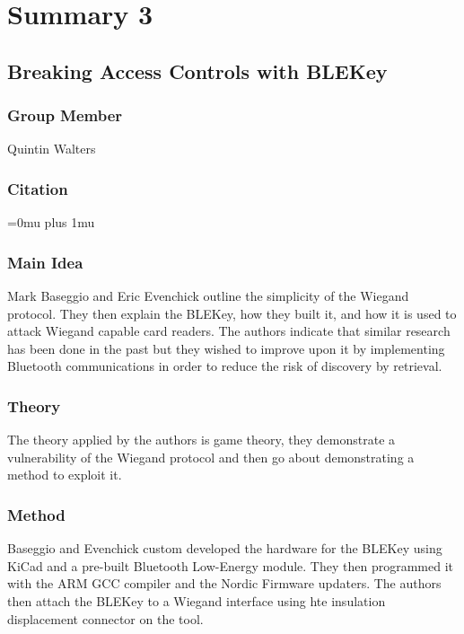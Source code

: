 \section{Summary 3}

\noindent
\subsection{{B}reaking {A}ccess {C}ontrols with {BLEK}ey}

\subsubsection{Group Member}

\noindent
Quintin Walters

\noindent
\subsubsection{Citation}

\Urlmuskip=0mu plus 1mu\relax

\subsubsection{Main Idea}

\noindent
Mark Baseggio and Eric Evenchick outline the simplicity of the Wiegand protocol.  They then explain the BLEKey, how they built it, and how it is used to attack Wiegand capable card readers.  The authors indicate that similar research has been done in the past but they wished to improve upon it by implementing Bluetooth communications in order to reduce the risk of discovery by retrieval.

\subsubsection{Theory}

\noindent
The theory applied by the authors is game theory, they demonstrate a vulnerability of the Wiegand protocol and then go about demonstrating a method to exploit it.

\subsubsection{Method}

\noindent
Baseggio and Evenchick custom developed the hardware for the BLEKey using KiCad and a pre-built Bluetooth Low-Energy module.  They then programmed it with the ARM GCC compiler and the Nordic Firmware updaters.  The authors then attach the BLEKey to a Wiegand interface using hte insulation displacement connector on the tool.


